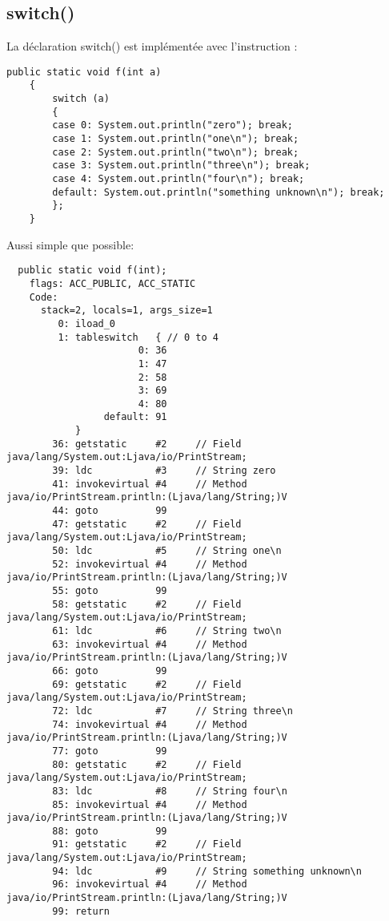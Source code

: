 \subsection{switch()}

La déclaration switch() est implémentée avec l'instruction :


\begin{lstlisting}[style=customjava]
	public static void f(int a)
	{
		switch (a)
		{
		case 0: System.out.println("zero"); break;
		case 1: System.out.println("one\n"); break;
		case 2: System.out.println("two\n"); break;
		case 3: System.out.println("three\n"); break;
		case 4: System.out.println("four\n"); break;
		default: System.out.println("something unknown\n"); break;
		};
	}
\end{lstlisting}

Aussi simple que possible:

\begin{lstlisting}
  public static void f(int);
    flags: ACC_PUBLIC, ACC_STATIC
    Code:
      stack=2, locals=1, args_size=1
         0: iload_0       
         1: tableswitch   { // 0 to 4
                       0: 36
                       1: 47
                       2: 58
                       3: 69
                       4: 80
                 default: 91
            }
        36: getstatic     #2     // Field java/lang/System.out:Ljava/io/PrintStream;
        39: ldc           #3     // String zero
        41: invokevirtual #4     // Method java/io/PrintStream.println:(Ljava/lang/String;)V
        44: goto          99
        47: getstatic     #2     // Field java/lang/System.out:Ljava/io/PrintStream;
        50: ldc           #5     // String one\n
        52: invokevirtual #4     // Method java/io/PrintStream.println:(Ljava/lang/String;)V
        55: goto          99
        58: getstatic     #2     // Field java/lang/System.out:Ljava/io/PrintStream;
        61: ldc           #6     // String two\n
        63: invokevirtual #4     // Method java/io/PrintStream.println:(Ljava/lang/String;)V
        66: goto          99
        69: getstatic     #2     // Field java/lang/System.out:Ljava/io/PrintStream;
        72: ldc           #7     // String three\n
        74: invokevirtual #4     // Method java/io/PrintStream.println:(Ljava/lang/String;)V
        77: goto          99
        80: getstatic     #2     // Field java/lang/System.out:Ljava/io/PrintStream;
        83: ldc           #8     // String four\n
        85: invokevirtual #4     // Method java/io/PrintStream.println:(Ljava/lang/String;)V
        88: goto          99
        91: getstatic     #2     // Field java/lang/System.out:Ljava/io/PrintStream;
        94: ldc           #9     // String something unknown\n
        96: invokevirtual #4     // Method java/io/PrintStream.println:(Ljava/lang/String;)V
        99: return        
\end{lstlisting}
